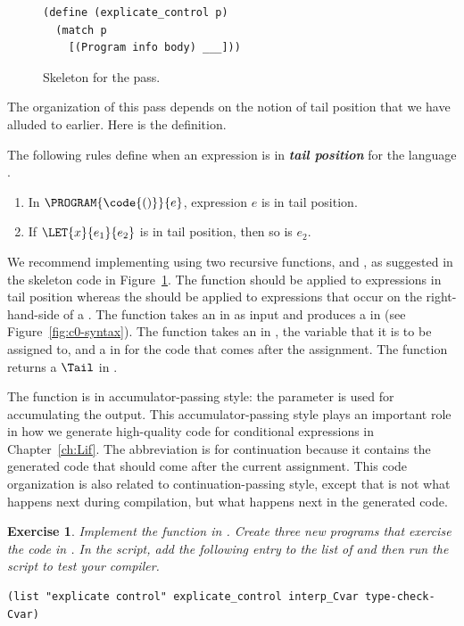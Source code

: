 \documentclass[7x10,nocrop]{TimesAPriori_MIT}%
\newtheorem{exercise}[theorem]{Exercise}
\begin{document}
{\begin{figure}[tbp]
\begin{lstlisting}
(define (explicate_control p)
  (match p
    [(Program info body) ___]))
\end{lstlisting}
\caption{Skeleton for the  pass.}
\label{fig:explicate-control-Lvar}
\end{figure}

The organization of this pass depends on the notion of tail position
that we have alluded to earlier. Here is the definition.

\begin{definition}
  The following rules define when an expression is in \textbf{\emph{tail
  position}} for the language \LangVar{}.
\begin{enumerate}
\item In $\PROGRAM{\code{()}}{e}$, expression $e$ is in tail position.
\item If $\LET{x}{e_1}{e_2}$ is in tail position, then so is $e_2$.
\end{enumerate}
\end{definition}

We recommend implementing  using two
recursive functions,  and
, as suggested in the skeleton code in
Figure~\ref{fig:explicate-control-Lvar}.  The 
function should be applied to expressions in tail position whereas the
 should be applied to expressions that occur on
the right-hand-side of a .
%
The  function takes an \Exp{} in \LangVar{} as
input and produces a \Tail{} in \LangCVar{} (see
Figure~\ref{fig:c0-syntax}).
%
The  function takes an \Exp{} in \LangVar{},
the variable that it is to be assigned to, and a \Tail{} in
\LangCVar{} for the code that comes after the assignment.  The
 function returns a $\Tail$ in \LangCVar{}.

The  function is in accumulator-passing style:
the  parameter is used for accumulating the output. This
accumulator-passing style plays an important role in how we generate
high-quality code for conditional expressions in Chapter~\ref{ch:Lif}.
The abbreviation  is for continuation because it contains
the generated code that should come after the current assignment.
This code organization is also related to continuation-passing style,
except that  is not what happens next during compilation,
but what happens next in the generated code.

\begin{exercise}\normalfont\normalsize
%
Implement the  function in
.  Create three new \LangInt{} programs that
exercise the code in .
%
In the  script, add the following entry to the
list of  and then run the script to test your compiler.
\begin{lstlisting}
(list "explicate control" explicate_control interp_Cvar type-check-Cvar)  
\end{lstlisting}
\end{exercise}
\fi}
\end{document}
